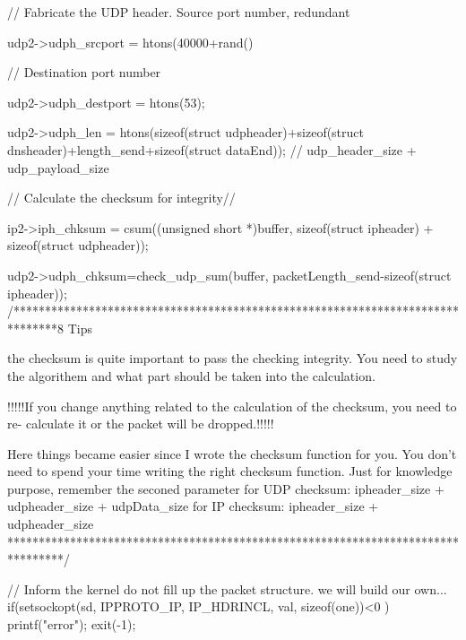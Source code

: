 \documentclass[a4paper,12pt]{article}
\begin{document}
{		     
		
		    // Fabricate the UDP header. Source port number, redundant
		
		    udp2->udph_srcport = htons(40000+rand()%
		
		    // Destination port number
		
		    udp2->udph_destport = htons(53);
		
		
		    udp2->udph_len = htons(sizeof(struct udpheader)+sizeof(struct dnsheader)+length_send+sizeof(struct dataEnd)); // udp_header_size + udp_payload_size
		
		
		
		
		
		
		
		
		    // Calculate the checksum for integrity//
		
		    ip2->iph_chksum = csum((unsigned short *)buffer, sizeof(struct ipheader) + sizeof(struct udpheader));
		 
		
		    udp2->udph_chksum=check_udp_sum(buffer, packetLength_send-sizeof(struct ipheader));
		/*******************************************************************************8
		Tips
		
		the checksum is quite important to pass the checking integrity. You need 
		to study the algorithem and what part should be taken into the calculation.
		
		!!!!!If you change anything related to the calculation of the checksum, you need to re-
		calculate it or the packet will be dropped.!!!!!
		
		Here things became easier since I wrote the checksum function for you. You don't need
		to spend your time writing the right checksum function.
		Just for knowledge purpose,
		remember the seconed parameter
		for UDP checksum:
		ipheader_size + udpheader_size + udpData_size  
		for IP checksum: 
		ipheader_size + udpheader_size
		*********************************************************************************/
		
		
		
		
		
		
		
		
		
		
		
		    // Inform the kernel do not fill up the packet structure. we will build our own...
		 if(setsockopt(sd, IPPROTO_IP, IP_HDRINCL, val, sizeof(one))<0 )
		{
			printf("error\n");	
			exit(-1);
		}
		
}
\end{document}
